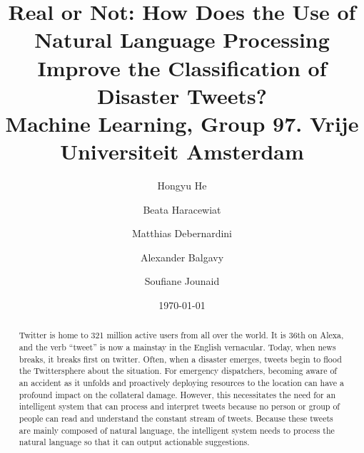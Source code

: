 \documentclass[10pt,notitlepage]{article}
\title{
  {Real or Not: How Does the Use of Natural Language Processing Improve the Classification of Disaster Tweets?}\\
  {\large Machine Learning, Group 97. Vrije Universiteit Amsterdam}
}
\author{
  Hongyu He
  \and Beata Haracewiat
  \and Matthias Debernardini
  \and Alexander Balgavy
  \and Soufiane Jounaid
}
\date{\today}
\begin{document}
  \maketitle

  \begin{abstract}
    Twitter is home to 321 million active users from all over the world.
    It is 36th on Alexa, and the verb ``tweet'' is now a mainstay in the English vernacular.
    Today, when news breaks, it breaks first on twitter.
    Often, when a disaster emerges, tweets begin to flood the Twittersphere about the situation.
    For emergency dispatchers, becoming aware of an accident as it unfolds and proactively deploying resources to the location can have a profound impact on the collateral damage.
    However, this necessitates the need for an intelligent system that can process and interpret tweets because no person or group of people can read and understand the constant stream of tweets.
    Because these tweets are mainly composed of natural language, the intelligent system needs to process the natural language so that it can output actionable suggestions.
  \end{abstract}

  
  
  
  
  
  

  \printbibliography

  
\end{document}
